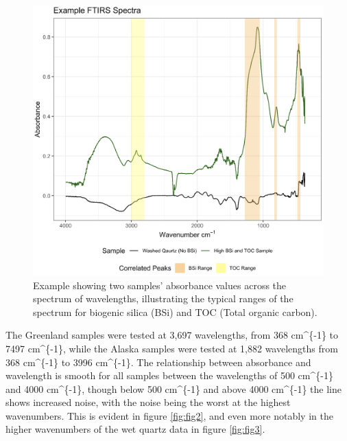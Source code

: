 \documentclass[water,article,submit,moreauthors,pdftex]{mdpi}
\begin{document}
\begin{figure}

{\centering \includegraphics[width=0.85\linewidth]{fig1} 

}

\caption{Example showing two samples' absorbance values across the spectrum of wavelengths, illustrating the typical ranges of the spectrum for biogenic silica (BSi) and TOC (Total organic carbon).}\label{fig:fig1}
\end{figure}

The Greenland samples were tested at 3,697 wavelengths, from 368
cm\^{}\{-1\} to 7497 cm\^{}\{-1\}, while the Alaska samples were tested
at 1,882 wavelengths from 368 cm\^{}\{-1\} to 3996 cm\^{}\{-1\}. The
relationship between absorbance and wavelength is smooth for all samples
between the wavelengths of 500 cm\^{}\{-1\} and 4000 cm\^{}\{-1\},
though below 500 cm\^{}\{-1\} and above 4000 cm\^{}\{-1\} the line shows
increased noise, with the noise being the worst at the highest
wavenumbers. This is evident in figure \ref{fig:fig2}, and even more
notably in the higher wavenumbers of the wet quartz data in figure
\ref{fig:fig3}.
\end{document}
